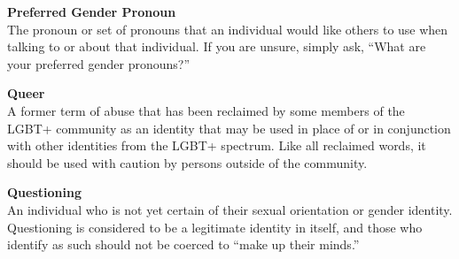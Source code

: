 \begin{titlepage}

\noindent\textbf{Preferred Gender Pronoun}\\
The pronoun or set of pronouns that an individual would like others to use when talking to or about that individual.  If you are unsure, simply ask, ``What are your preferred gender pronouns?'' %
\vspace*{\baselineskip}

\noindent\textbf{Queer}\\
A former term of abuse that has been reclaimed by some members of the LGBT+ community as an identity that may be used in place of or in conjunction with other identities from the LGBT+ spectrum. Like all reclaimed words, it should be used with caution by persons outside of the community.
\vspace*{\baselineskip}

\noindent\textbf{Questioning}\\
An individual who is not yet certain of their sexual orientation or gender identity. 
Questioning is considered to be a legitimate identity in itself, and those who identify as such should not be coerced to ``make up their minds.'' \\ %


\end{titlepage}
